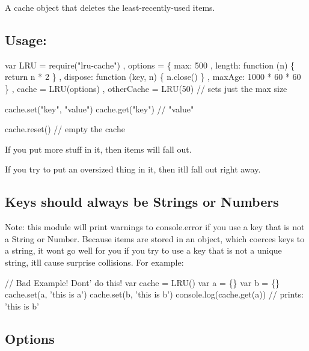 A cache object that deletes the least-\/recently-\/used items.

\subsection*{Usage\+:}


\begin{DoxyCode}
var LRU = require("lru-cache")
  , options = \{ max: 500
              , length: function (n) \{ return n * 2 \}
              , dispose: function (key, n) \{ n.close() \}
              , maxAge: 1000 * 60 * 60 \}
  , cache = LRU(options)
  , otherCache = LRU(50) // sets just the max size

cache.set("key", "value")
cache.get("key") // "value"

cache.reset()    // empty the cache
\end{DoxyCode}


If you put more stuff in it, then items will fall out.

If you try to put an oversized thing in it, then it\textquotesingle{}ll fall out right away.

\subsection*{Keys should always be Strings or Numbers}

Note\+: this module will print warnings to {\ttfamily console.\+error} if you use a key that is not a String or Number. Because items are stored in an object, which coerces keys to a string, it won\textquotesingle{}t go well for you if you try to use a key that is not a unique string, it\textquotesingle{}ll cause surprise collisions. For example\+:


\begin{DoxyCode}
// Bad Example!  Dont' do this!
var cache = LRU()
var a = \{\}
var b = \{\}
cache.set(a, 'this is a')
cache.set(b, 'this is b')
console.log(cache.get(a)) // prints: 'this is b'
\end{DoxyCode}


\subsection*{Options}


